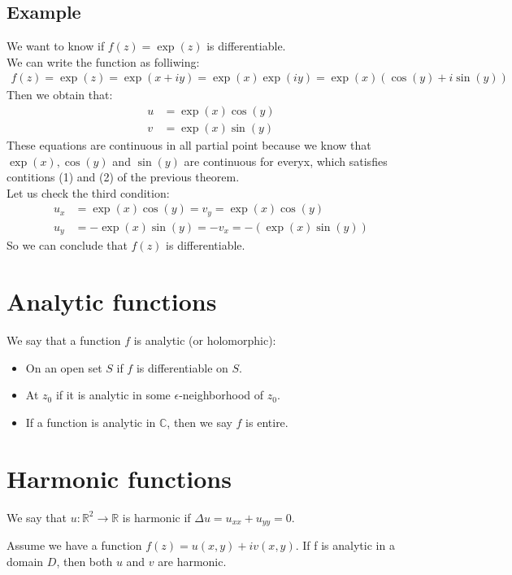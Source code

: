 \documentclass{article}
\def\C{\mathbb{C}}
\def\R{\mathbb{R}}
\renewcommand{\exp}[1]{\operatorname{exp}\left(#1\right)}
\begin{document}
    \subsection{Example}
    We want to know if $f(z) = \exp{z}$ is differentiable. \\
    We can write the function as folliwing:
    \begin{align*}
        f(z) = \exp{z} = \exp{x+iy} = \exp{x}\exp{iy} = \exp{x}(\cos(y) + i\sin(y))
    \end{align*}
    Then we obtain that:
    \begin{align*}
        u &= \exp{x}\cos(y) \\
        v &= \exp{x}\sin(y)
    \end{align*}
    \noindent
    These equations are continuous in all partial point because we know that $\exp{x}, \cos(y)$ and $\sin(y)$ are continuous for everyx, which satisfies contitions (1) and (2) of the previous theorem.
    \\ Let us check the third condition:
    \begin{align*}
        u_x &= \exp{x}\cos(y) = v_y = \exp{x}\cos(y) \\
        u_y &= -\exp{x}\sin(y) = -v_x = -(\exp{x}\sin(y))
    \end{align*}
    So we can conclude that $f(z)$ is differentiable.\\
    
    \section{Analytic functions}
    We say that a function $f$ is analytic (or holomorphic):
    \begin{itemize}
        \item On an open set $S$ if $f$ is differentiable on $S$.
        \item At $z_0$ if it is analytic in some $\epsilon$-neighborhood of $z_0$.
        \item If a function is analytic in $\C$, then we say $f$ is entire.
    \end{itemize}

    \section{Harmonic functions}
    We say that $u\colon\R^2 \longrightarrow \R$ is harmonic if $\Delta u = u_{xx} + u_{yy} = 0$.

    \begin{tcolorbox}[title=Theorem]
        Assume we have a function $f(z) = u(x,y) + iv(x,y)$. If f is analytic in a domain $D$, then both $u$ and $v$ are harmonic.
    \end{tcolorbox}
\end{document}
